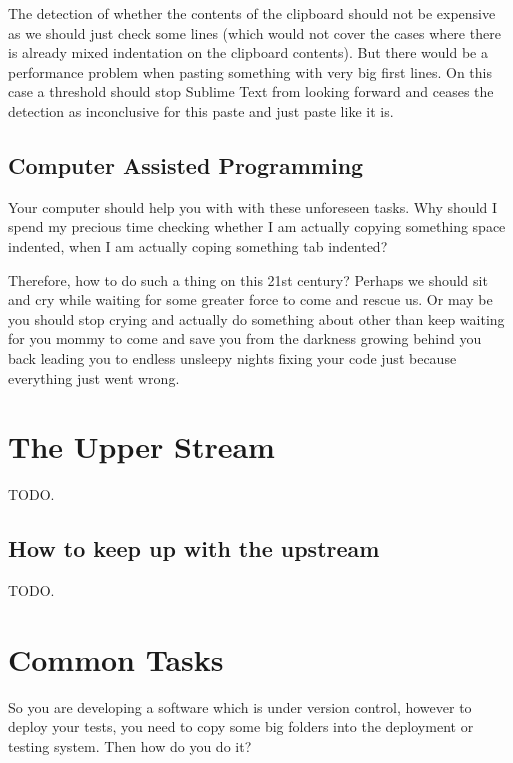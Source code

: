 \begin{englishtext}
    The detection of whether the contents of the clipboard should not be
    expensive as we should just check some lines (which would not cover the
    cases where there is already mixed indentation on the clipboard contents).
    But there would be a performance problem when pasting something with very
    big first lines. On this case a threshold should stop Sublime Text from
    looking forward and ceases the detection as inconclusive for this paste and
    just paste like it is.



    \subsection{Computer Assisted Programming}

    Your computer should help you with with these unforeseen tasks. Why should I
    spend my precious time checking whether I am actually copying something
    space indented, when I am actually coping something tab indented?

    Therefore, how to do such a thing on this 21\q{}st century? Perhaps we
    should sit and cry while waiting for some greater force to come and rescue
    us. Or may be you should stop crying and actually do something about other
    than keep waiting for you mommy to come and save you from the darkness
    growing behind you back leading you to endless unsleepy nights fixing your
    code just because everything just went wrong.



    \section{The Upper Stream}

    TODO.


    \subsection{How to keep up with the upstream}

    TODO.



    \section{Common Tasks}

    So you are developing a software which is under version control, however to
    deploy your tests, you need to copy some big folders into the deployment or
    testing system. Then how do you do it?


\end{englishtext}

